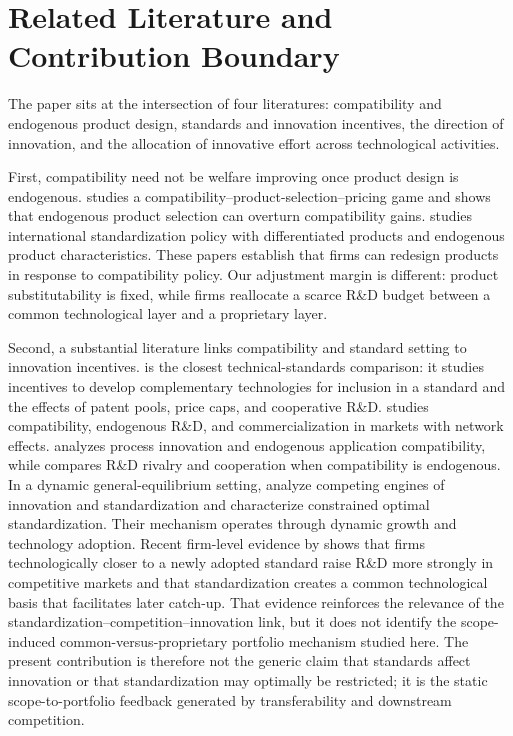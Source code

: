 \section{Related Literature and Contribution Boundary}

The paper sits at the intersection of four literatures: compatibility and endogenous product design, standards and innovation incentives, the direction of innovation, and the allocation of innovative effort across technological activities.

First, compatibility need not be welfare improving once product design is endogenous. \citet{Boom2001} studies a compatibility--product-selection--pricing game and shows that endogenous product selection can overturn compatibility gains. \citet{Ruiz2004} studies international standardization policy with differentiated products and endogenous product characteristics. These papers establish that firms can redesign products in response to compatibility policy. Our adjustment margin is different: product substitutability is fixed, while firms reallocate a scarce R\&D budget between a common technological layer and a proprietary layer.

Second, a substantial literature links compatibility and standard setting to innovation incentives. \citet{Llanes2024} is the closest technical-standards comparison: it studies incentives to develop complementary technologies for inclusion in a standard and the effects of patent pools, price caps, and cooperative R\&D. \citet{BondSmith2019} studies compatibility, endogenous R\&D, and commercialization in markets with network effects. \citet{MaruyamaZennyo2017} analyzes process innovation and endogenous application compatibility, while \citet{HeywoodWangYe2022} compares R\&D rivalry and cooperation when compatibility is endogenous. In a dynamic general-equilibrium setting, \citet{AcemogluGanciaZilibotti2012} analyze competing engines of innovation and standardization and characterize constrained optimal standardization. Their mechanism operates through dynamic growth and technology adoption. Recent firm-level evidence by \citet{BergeaudSchmidtZago2026} shows that firms technologically closer to a newly adopted standard raise R\&D more strongly in competitive markets and that standardization creates a common technological basis that facilitates later catch-up. That evidence reinforces the relevance of the standardization--competition--innovation link, but it does not identify the scope-induced common-versus-proprietary portfolio mechanism studied here. The present contribution is therefore not the generic claim that standards affect innovation or that standardization may optimally be restricted; it is the static scope-to-portfolio feedback generated by transferability and downstream competition.

